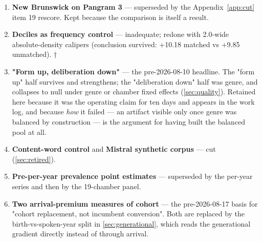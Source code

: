 \begin{enumerate}
\item
  \textbf{New Brunswick on Pangram 3} --- superseded by the Appendix~\ref{app:cut} item 19
  rescore. Kept
  because the comparison is itself a result.
\item
  \textbf{Deciles as frequency control} --- inadequate; redone with 2.0-wide
  absolute-density calipers (conclusion survived: +10.18 matched vs +9.85
  unmatched). †
\item
  \textbf{"Form up, deliberation down"} --- the pre-2026-08-10 headline. The
  "form up" half survives and strengthens; the "deliberation down" half was
  genre, and collapses to null under genre or chamber fixed effects (\cref{sec:quality}).
  Retained here because it was the operating claim for ten days and appears
  in the work log, and because \emph{how} it failed --- an artifact visible only
  once genre was balanced by construction --- is the argument for having built
  the balanced pool at all.
\item
  \textbf{Content-word control} and \textbf{Mistral synthetic corpus} --- cut (\cref{sec:retired}).
\item
  \textbf{Pre-per-year prevalence point estimates} --- superseded by the per-year
  series and then by the 19-chamber panel.
\item
  \textbf{Two arrival-premium measures of cohort} --- the pre-2026-08-17 basis for
  "cohort replacement, not incumbent conversion". Both are replaced by the
  birth-vs-spoken-year split in \cref{sec:generational}, which reads the generational gradient
  directly instead of through arrival.


\end{enumerate}
